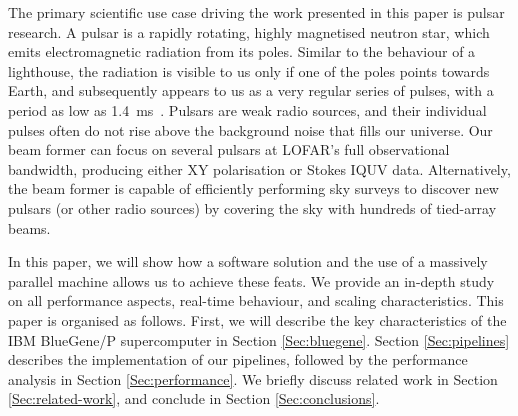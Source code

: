 \documentclass{llncs}
\begin{document}
The primary scientific use case driving the work presented in this paper is pulsar research. A pulsar is a rapidly rotating, highly magnetised neutron star, which emits electromagnetic radiation from its poles. Similar to the behaviour of a lighthouse, the radiation is visible to us only if one of the poles points towards Earth, and subsequently appears to us as a very regular series of pulses, with a period as low as 1.4~ms~\cite{Hessels:06}. Pulsars are weak radio sources, and their individual pulses often do not rise above the background noise that fills our universe. Our beam former can focus on several pulsars at LOFAR's full observational bandwidth, producing either XY polarisation or Stokes IQUV data. Alternatively, the beam former is capable of efficiently performing sky surveys to discover new pulsars (or other radio sources) by covering the sky with hundreds of tied-array beams.




In this paper, we will show how a software solution and the use of a massively parallel machine allows us to achieve these feats. We provide an in-depth study on all performance aspects, real-time behaviour, and scaling characteristics. This paper is organised as follows. First, we will describe the key characteristics of the IBM BlueGene/P supercomputer in Section \ref{Sec:bluegene}. Section \ref{Sec:pipelines} describes the implementation of our pipelines, followed by the performance analysis in Section \ref{Sec:performance}. We briefly discuss related work in Section \ref{Sec:related-work}, and conclude in Section \ref{Sec:conclusions}.
\end{document}
